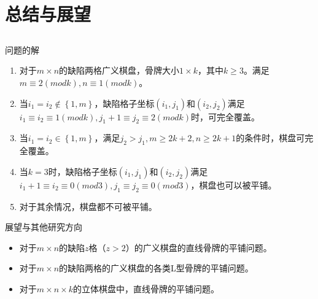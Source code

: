 \documentclass[
    fontset=fandol,
    xcolor=svgnames %
]{ctexbeamer}
\begin{document}
\section{总结与展望}

\subsection{}

\begin{frame}
    \begin{block}{问题的解}
        \begin{enumerate}
            \item 对于$m \times n$的缺陷两格广义棋盘，骨牌大小$1 \times k$，其中$k \ge 3$。满足$m \equiv 2 (mod k), n \equiv 1 (mod k)$。
            \item 当$i_1 = i_2 \notin \left\{1, m\right\}$，缺陷格子坐标$(i_1, j_1)$和$(i_2, j_2)$满足$i_1 \equiv i_2 \equiv 1 (mod k), j_1 + 1 \equiv j_2 \equiv 2 (mod k)$时，可完全覆盖。
            \item 当$i_1 = i_2 \in \left\{1, m\right\}$，满足$j_2 > j_1, m \ge 2k + 2, n \ge 2k + 1$的条件时，棋盘可完全覆盖。
            \item 当$k = 3$时，缺陷格子坐标$(i_1, j_1)$和$(i_2, j_2)$满足$i_1 + 1\equiv i_2 \equiv 0 (mod 3), j_1 \equiv j_2 \equiv 0 (mod 3)$，棋盘也可以被平铺。
            \item 对于其余情况，棋盘都不可被平铺。
        \end{enumerate}
    \end{block}
\end{frame}

\begin{frame}
    \begin{block}{展望与其他研究方向}
        \begin{itemize}
            \item 对于$m \times n$的缺陷$z$格（$z > 2$）的广义棋盘的直线骨牌的平铺问题。
            \item 对于$m \times n$的缺陷两格的广义棋盘的各类L型骨牌的平铺问题。
            \item 对于$m \times n \times k$的立体棋盘中，直线骨牌的平铺问题。
        \end{itemize}
    \end{block}
\end{frame}
\end{document}
